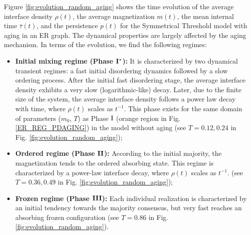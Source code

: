 

Figure \ref{fig:evolution_random_aging} shows the time evolution of the average interface density $\rho(t)$, the average magnetization $m(t)$, the mean internal time $\bar{\tau}(t)$, and the persistence $p(t)$ for the Symmetrical Threshold model with aging in an ER graph. The dynamical properties are largely affected by the aging mechanism. In terms of the evolution, we find the following regimes:
\begin{itemize}
    \item \textbf{Initial mixing regime (Phase ${\rm {\bf I}}^{*}$):} It is characterized by two dynamical transient regimes: a fast initial disordering dynamics followed by a slow ordering process. After the initial fast disordering stage, the average interface density exhibits a very slow (logarithmic-like) decay. Later, due to the finite size of the system, the average interface density follows a power law decay with time, where $\rho(t)$ scales as $t^{-1}$. This phase exists for the same domain of parameters ($m_0$, $T$) as Phase ${\rm I}$ (orange region in Fig. \ref{ER_REG_PDAGING}) in the model without aging (see $T = 0.12, 0.24$ in Fig. \ref{fig:evolution_random_aging});
    \item \textbf{Ordered regime (Phase ${\rm {\bf II}}$):} According to the initial majority, the magnetization tends to the ordered absorbing state. This regime is characterized by a power-law interface decay, where $\rho(t)$ scales as $t^{-1}$. (see $T = 0.36, 0.49$ in Fig. \ref{fig:evolution_random_aging});
    \item \textbf{Frozen regime (Phase ${\rm {\bf III}}$):} Each individual realization is characterized by an initial tendency towards the majority consensus, but very fast reaches an absorbing frozen configuration (see $T = 0.86$ in Fig. \ref{fig:evolution_random_aging}).
\end{itemize}
